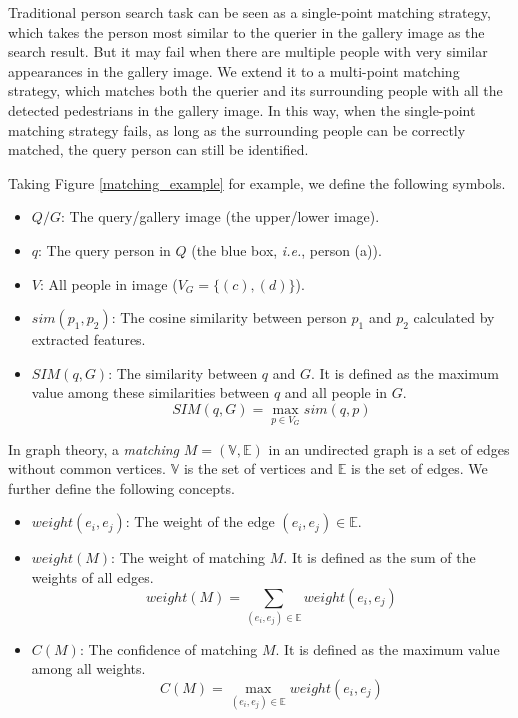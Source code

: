 \documentclass[letterpaper]{article} \usepackage{aaai21}  \usepackage{times}  \usepackage{helvet} \usepackage{courier}  \usepackage[hyphens]{url}  \usepackage{graphicx} \urlstyle{rm} \def\UrlFont{\rm}  \usepackage{natbib}  \usepackage{caption} \usepackage{multirow}
\begin{document}
Traditional person search task can be seen as a single-point matching strategy, which takes the person most similar to the querier in the gallery image as the search result. But it may fail when there are multiple people with very similar appearances in the gallery image. We extend it to a multi-point matching strategy, which matches both the querier and its surrounding people with all the detected pedestrians in the gallery image. In this way, when the single-point matching strategy fails, as long as the surrounding people can be correctly matched, the query person can still be identified.

Taking Figure \ref{matching_example} for example, we define the following symbols.
\begin{itemize}
    \item $Q/G$: The query/gallery image (the upper/lower image).
    \item $q$: The query person in $Q$ (the blue box, \textit{i.e.}, person (a)).
    \item $V$: All people in image ($V_G=\{(c),(d)\}$).
    \item $sim(p_1, p_2)$: The cosine similarity between person $p_1$ and $p_2$ calculated by extracted features.
    \item $SIM(q,G)$: The similarity between $q$ and $G$. It is defined as the maximum value among these similarities between $q$ and all people in $G$.
    \begin{equation}
        SIM(q,G)=\max_{p\in V_G}sim(q, p)
    \end{equation}
\end{itemize}

In graph theory, a \textit{matching} $M=(\mathbb{V},\mathbb{E})$ in an undirected graph is a set of edges without common vertices. $\mathbb{V}$ is the set of vertices and $\mathbb{E}$ is the set of edges. We further define the following concepts.
\begin{itemize}
    \item $weight(e_i,e_j)$: The weight of the edge $(e_i,e_j)\in \mathbb{E}$.
    \item $weight(M)$: The weight of matching $M$. It is defined as the sum of the weights of all edges.
    \begin{equation}
        weight(M)=\sum_{(e_i,e_j)\in \mathbb{E}}weight(e_i,e_j)
    \end{equation}
    \item $C(M)$: The confidence of matching $M$. It is defined as the maximum value among all weights.
    \begin{equation}
        C(M)=\max_{(e_i,e_j)\in \mathbb{E}}weight(e_i,e_j)
    \end{equation}
\end{itemize}
\end{document}
